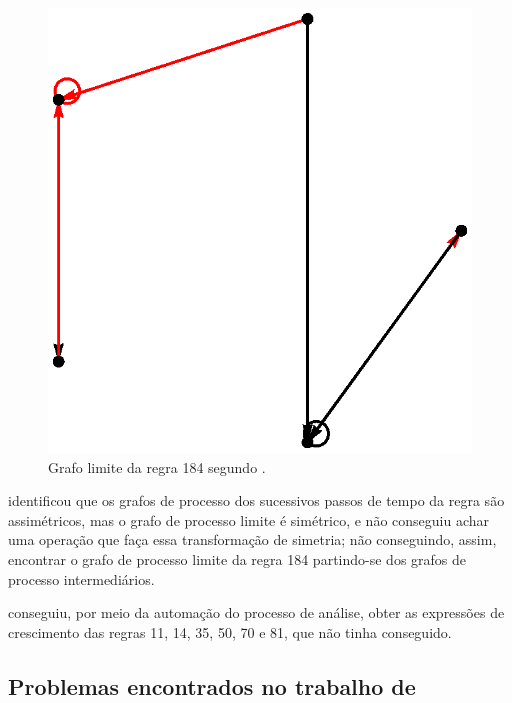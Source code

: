 \documentclass[12pt,a4paper]{article}
\begin{document}
\begin{figure}[htp]
\begin{center}
\includegraphics[scale=0.8]{img/limit184.eps}
\caption{Grafo limite da regra 184 segundo .}
\label{fig:limit184}
\end{center}
\end{figure}

 identificou que os grafos de processo dos sucessivos passos de
tempo da regra são assimétricos, mas o grafo de processo limite é simétrico, e não
conseguiu achar uma operação que faça essa transformação de simetria;
não conseguindo, assim, encontrar o grafo de processo limite da regra 184
partindo-se dos grafos de processo intermediários.

 conseguiu, por meio da automação do processo de análise,
obter as expressões de crescimento das regras 11, 14, 35, 50, 70 e 81, que
 não tinha conseguido.

\subsection{Problemas encontrados no trabalho de
}\label{sec:problem}
\end{document}
